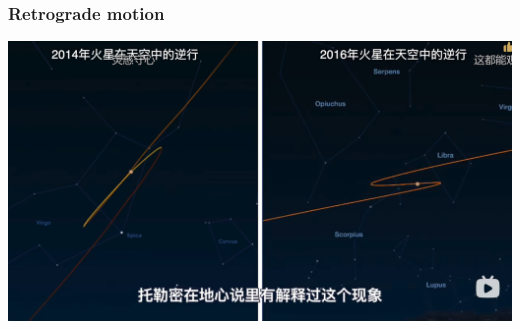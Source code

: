 \documentclass[aspectratio=1611, 9pt]{beamer}
\begin{document}
\begin{frame}
  \frametitle{Retrograde motion}
  \begin{center}
    \includegraphics[width=\textwidth]{pictures/2025-09-27_21-33-05.png}
  \end{center}
\end{frame}
\end{document}
